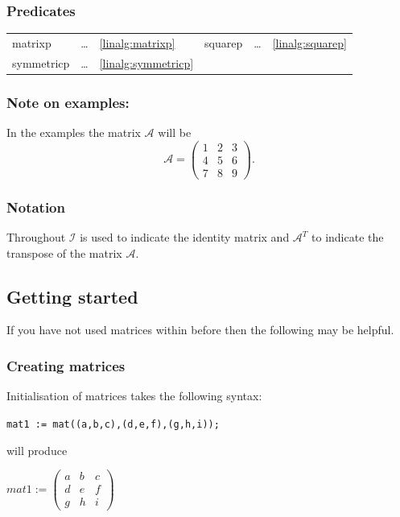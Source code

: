 {\subsubsection{Predicates}

\begin{center}
  \begin{tabular}{l l l l l l}
    matrixp     & \ldots &\ref{linalg:matrixp} &
    squarep     & \ldots &\ref{linalg:squarep} \\
    symmetricp  & \ldots &\ref{linalg:symmetricp} &
  \end{tabular}
\end{center}


\subsubsection*{Note on examples:}

In the examples the matrix $\mathcal{A}$ will be
\[
\mathcal{A} = \begin{pmatrix} 1 & 2 & 3 \\ 4 & 5 & 6 \\ 7 & 8 & 9 \end{pmatrix}.
\]


\subsubsection*{Notation}

Throughout $\mathcal{I}$ is used to indicate the identity matrix and
$\mathcal{A}^T$ to indicate the transpose of the matrix $\mathcal{A}$.

\subsection{Getting started}

If you have not used matrices within {\REDUCE} before then the following may be
helpful.

\subsubsection*{Creating matrices}

Initialisation of matrices takes the following syntax:

\texttt{mat1 := mat((a,b,c),(d,e,f),(g,h,i));}

will produce

\begin{flushleft}
\(
\mathit{mat1} := \begin{pmatrix} a & b & c \\ d & e & f \\ g & h & i \end{pmatrix}
\)
\end{flushleft}

}
